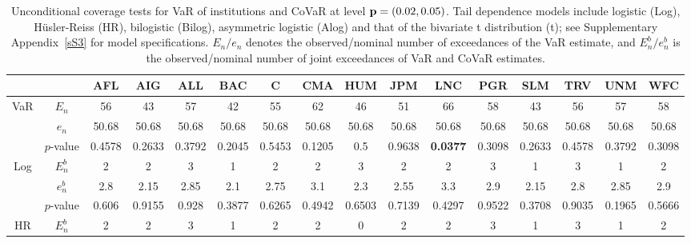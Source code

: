 \begin{landscape}
\begin{table}[H]
\tiny
\centering
\caption{Unconditional coverage tests for VaR of institutions and CoVaR at level ${\mathbf p} = (0.02,0.05)$. Tail dependence models include logistic (Log),  H\"{u}sler-Reiss (HR), bilogistic (Bilog), asymmetric logistic (Alog) and that of the bivariate t distribution (t); see Supplementary Appendix~\ref{sS3} for model specifications. $E_n/e_n$ denotes the observed/nominal number of exceedances of the VaR estimate, and $E_n^b/e_n^b$ is the observed/nominal number of joint exceedances of VaR and CoVaR estimates.}
\vspace{12pt}
\begin{tabular}{cc|cccccccccccccc}
\hline
                        &           & AFL    & AIG    & ALL             & BAC             & C      & CMA    & HUM         & JPM    & LNC             & PGR    & SLM    & TRV    & UNM    & WFC    \\ \hline
\multirow{3}{*}{VaR}    & $E_n$     & 56     & 43     & 57              & 42              & 55     & 62     & 46          & 51     & 66              & 58     & 43     & 56     & 57     & 58     \\ 
                        & $e_n$     & 50.68  & 50.68  & 50.68           & 50.68           & 50.68  & 50.68  & 50.68       & 50.68  & 50.68           & 50.68  & 50.68  & 50.68  & 50.68  & 50.68  \\
                        & $p$-value & 0.4578 & 0.2633 & 0.3792          & 0.2045          & 0.5453 & 0.1205 & 0.5         & 0.9638 & \textbf{0.0377} & 0.3098 & 0.2633 & 0.4578 & 0.3792 & 0.3098 \\ \hline
\multirow{3}{*}{Log}    & $E_n^b$   & 2      & 2      & 3               & 1               & 2      & 2      & 3           & 2      & 2               & 3      & 1      & 3      & 1      & 2      \\
                        & $e_n^b$   & 2.8    & 2.15   & 2.85            & 2.1             & 2.75   & 3.1    & 2.3         & 2.55   & 3.3             & 2.9    & 2.15   & 2.8    & 2.85   & 2.9    \\
                        & $p$-value & 0.606  & 0.9155 & 0.928           & 0.3877          & 0.6265 & 0.4942 & 0.6503      & 0.7139 & 0.4297          & 0.9522 & 0.3708 & 0.9035 & 0.1965 & 0.5666 \\ \hline
\multirow{3}{*}{HR}     & $E_n^b$   & 2      & 2      & 3               & 1               & 2      & 2      & 0           & 2      & 2               & 3      & 1      & 3      & 1      & 2      \\

\end{tabular}
\end{table}
\end{landscape}
